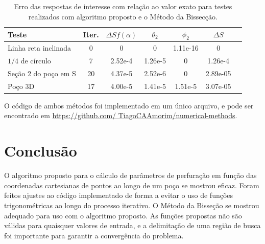 \documentclass[final,5p]{elsarticle}
\numberwithin{equation}{section}
\begin{document}
    \begin{table} 
        \caption{Erro das respostas de interesse com relação ao valor exato para testes realizados com algoritmo proposto e o Método da Bissecção.}
        \begin{tabular}{ l c c c c c c }
            \hline
            Teste & Iter. & $\Delta S f(\alpha)$ & $\theta_2$ & $\phi_2$ & $\Delta S$ \\
            \hline
            Linha reta inclinada     & 0  & 0       & 0       & 1.11e-16 & 0  \\
            $1/4$ de círculo         & 7  & 2.52e-4 & 1.26e-5 & 0        & 1.26e-4 \\
            Seção 2 do poço em S & 20 & 4.37e-5 & 2.52e-6 & 0        & 2.89e-05 \\
            Poço 3D                  & 17 & 4.00e-5 & 1.41e-5 & 1.51e-5  & 3.07e-05 \\
            \hline
        \end{tabular}
        \label{table:resultados}
    \end{table}

    O código de ambos métodos foi implementado em um único arquivo, e pode ser encontrado em \href{https://github.com/TiagoCAAmorim/numerical-methods/blob/main/01_Bissecao/01_bissection.c}{https://github.com/ TiagoCAAmorim/numerical-methods}.
    
    \section{Conclusão}
    
    O algoritmo proposto para o cálculo de parâmetros de perfuração em função das coordenadas cartesianas de pontos ao longo de um poço se mostrou eficaz. Foram feitos ajustes ao código implementado de forma a evitar o uso de funções trigonométricas ao longo do processo iterativo.
    O Método da Bisseção se mostrou adequado para uso com o algoritmo proposto. As funções propostas não são válidas para quaisquer valores de entrada, e a delimitação de uma região de busca foi importante para garantir a convergência do problema.


\end{document}
